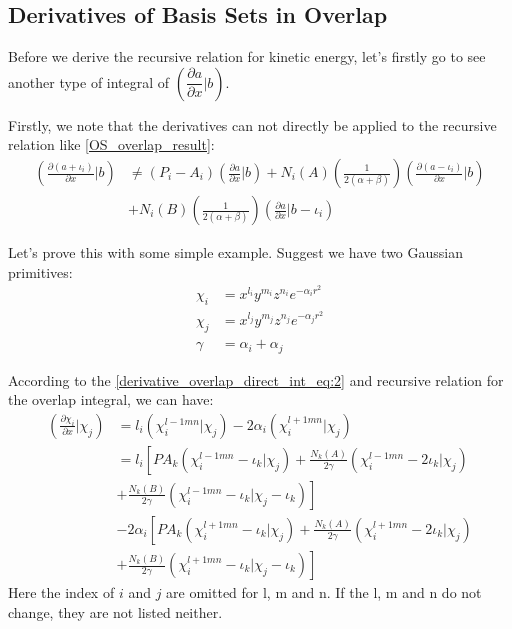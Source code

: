 \subsection{Derivatives of Basis Sets in Overlap}
%
%
%
Before we derive the recursive relation for kinetic energy, let's firstly 
go to see another type of integral of 
$\left( \dfrac{\partial a}{\partial x}|b\right)$.

Firstly, we note that the derivatives can not directly be applied to the 
recursive relation like \ref{OS_overlap_result}:
\begin{equation}
\begin{split}
(\frac{\partial (a+\iota_{i})}{\partial x}|b) & \neq 
(P_{i} - A_{i})(\frac{\partial a}{\partial x}|b) + 
N_{i}(A)\left(\frac{1}{2(\alpha+\beta)}\right)(\frac{\partial(a-\iota_{i})}{\partial x}|b) \\
&+ 
N_{i}(B)\left(\frac{1}{2(\alpha+\beta)}\right)(\frac{\partial a}{\partial x}|b-\iota_{i})  
\end{split}
\end{equation}

Let's prove this with some simple example. Suggest we have two Gaussian 
primitives:
\begin{align}
 \chi_{i} &= x^{l_{i}}y^{m_{i}}z^{n_{i}} e^{-\alpha_{i} r^{2}} \nonumber \\
 \chi_{j} &= x^{l_{j}}y^{m_{j}}z^{n_{j}} e^{-\alpha_{j} r^{2}} \nonumber \\
 \gamma   &= \alpha_{i} + \alpha_{j}
 \end{align}

According to the \ref{derivative_overlap_direct_int_eq:2} and recursive relation
for the overlap integral, we can have:
\begin{equation}
 \begin{split}
 \left(\frac{\partial \chi_{i}}{\partial x}|\chi_{j}\right)  &= 
 l_{i}(\chi_{i}^{l-1mn}|\chi_{j}) - 2\alpha_{i} (\chi_{i}^{l+1mn}|\chi_{j}) \\
 &= l_{i}\left[ PA_{k}(\chi_{i}^{l-1mn}-\iota_{k}|\chi_{j}) + 
 \frac{N_{k}(A)}{2 \gamma}(\chi_{i}^{l-1mn}-2\iota_{k}|\chi_{j})  \right. \\ 
 &+ \left. \frac{N_{k}(B)}{2 \gamma}(\chi_{i}^{l-1mn}-\iota_{k}|\chi_{j}-\iota_{k})
 \right] \\
 &-2\alpha_{i} \left[ PA_{k}(\chi_{i}^{l+1mn}-\iota_{k}|\chi_{j}) + 
 \frac{N_{k}(A)}{2 \gamma}(\chi_{i}^{l+1mn}-2\iota_{k}|\chi_{j}) \right. \\ 
 &+ \left. \frac{N_{k}(B)}{2 \gamma}(\chi_{i}^{l+1mn}-\iota_{k}|\chi_{j}-\iota_{k})
 \right] 
 \end{split}
 \label{deriv_os_overlap:1}
\end{equation}
Here the index of $i$ and $j$ are omitted for l, m and n. If the l, m and n do not 
change, they are not listed neither.


